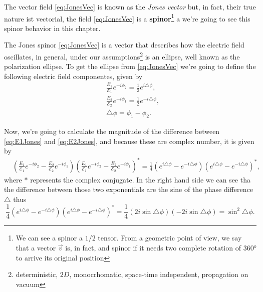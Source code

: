         The vector field \ref{eq:JonesVec} is known as the \textit{Jones vector} but, in fact, their true nature ist vectorial, the field \ref{eq:JonesVec} is a \textbf{spinor}\footnote{We can see a spinor a $1/2$ tensor. From a geometric point of view, we say that a vector $\vec{v}$ is, in fact, and spinor if it needs two complete rotation of $360$° to arrive its original position} a we're going to see this spinor behavior in this chapter. 

        The Jones spinor \ref{eq:JonesVec} is a vector that describes how the electric field oscillates, in general, under our assumptions\footnote{deterministic, $2D$, monocrhomatic, space-time independent, propagation on vacuum} is an ellipse, well known as the polarization ellipse. To get the ellipse from \ref{eq:JonesVec} we're going to define the following electric field componentes, given by
        \begin{align}
            & \frac{E_1}{\mathcal{E}_1}e^{-i\phi_2} = \frac{1}{2}e^{i\triangle\phi}, \label{eq:E1Jones}\\
            & \frac{E_2}{\mathcal{E}_2}e^{-i\phi_1} = \frac{1}{2}e^{-i\triangle\phi}, \label{eq:E2Jones}\\
            & \triangle\phi = \phi_1-\phi_2. \nonumber
        \end{align}

        Now, we're going to calculate the magnitude of the difference between \ref{eq:E1Jones} and \ref{eq:E2Jones}, and because these are complex number, it is given by
        \begin{align*}
            & \left(\frac{E_1}{\mathcal{E}_1}e^{-i\phi_2} -  \frac{E_2}{\mathcal{E}_2}e^{-i\phi_1}\right)\left(\frac{E_1}{\mathcal{E}_1}e^{-i\phi_2} -  \frac{E_2}{\mathcal{E}_2}e^{-i\phi_1}\right)^* = \frac{1}{4}\left(e^{i\triangle\phi} - e^{-i\triangle\phi} \right)\left(e^{i\triangle\phi} - e^{-i\triangle\phi} \right)^*,
        \end{align*}
        where $*$ represents the complex conjugate. In the right hand side we can see tha the difference between those two exponentials are the sine of the phase difference $\triangle$ thus
        \begin{equation}\label{eq:EllipseRHS}
            \frac{1}{4}\left(e^{i\triangle\phi} - e^{-i\triangle\phi} \right)\left(e^{i\triangle\phi} - e^{-i\triangle\phi} \right)^* = \frac{1}{4}\left(2i\sin\triangle\phi \right)\left(-2i\sin\triangle\phi \right) = \sin^2\triangle\phi.
        \end{equation}

